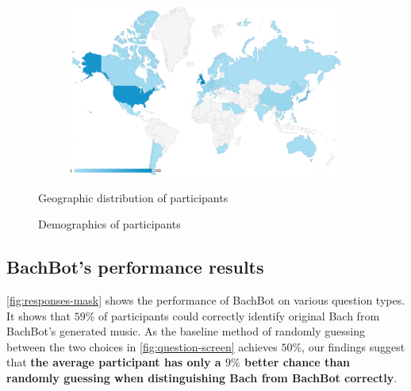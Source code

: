 \begin{figure}[p]
  \centering
  \begin{subfigure}[b]{0.98\textwidth}
    \centering
    \includegraphics[width=0.85\linewidth]{participants-by-country.png}
  \end{subfigure}
  \begin{subfigure}[c]{0.55\textwidth}
    \centering
    
  \end{subfigure}
  \begin{subfigure}[c]{0.44\textwidth}
    \centering
    
  \end{subfigure}
  \caption{Geographic distribution of participants}
  \label{fig:user-geographics}
\end{figure}

\begin{figure}[tb]
  \centering
  
  \caption{Demographics of participants}
  \label{fig:user-demographics}
\end{figure}

\subsection{BachBot's performance results}


\cref{fig:responses-mask} shows the performance of BachBot on various question
types. It shows that $59\%$ of participants could correctly
identify original Bach from BachBot's generated music. As the baseline method
of randomly guessing between the two choices in \cref{fig:question-screen}
achieves $50\%$, our findings suggest that {\bf the average participant has only a
$9\%$ better chance than randomly guessing when
distinguishing Bach from BachBot correctly}.

